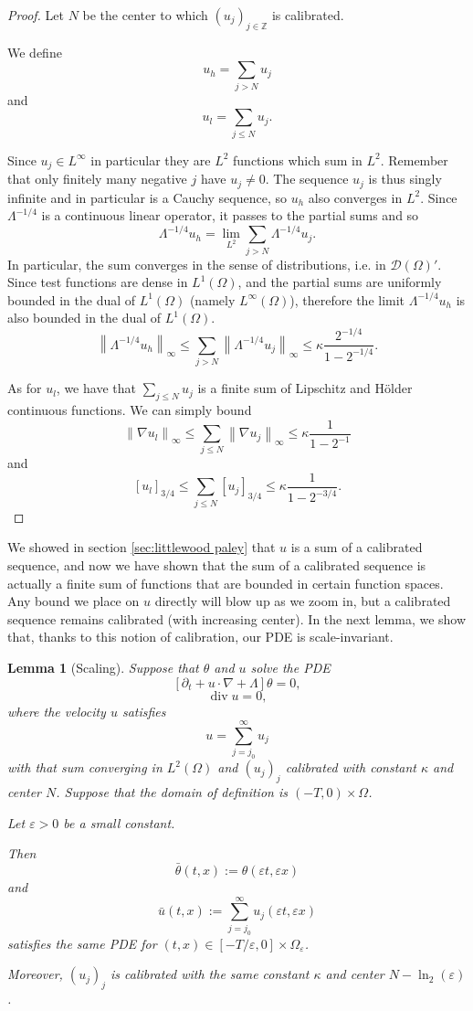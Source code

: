 \documentclass[11pt]{amsart}
\newtheorem{lemma}[theorem]{Lemma}
\theoremstyle{remark}
\theoremstyle{definition}
\newcommand{\Z}{\mathbb{Z}}
\newcommand{\eps}{\varepsilon}
\newcommand{\norm}[1]{\left\lVert#1\right\rVert}
\newcommand{\bracket}[1]{\left[ #1 \right]}
\newcommand{\del}{\partial}
\newcommand{\grad}{\nabla}
\renewcommand{\div}{\operatorname{div}}
\newcommand{\test}{\mathcal{D}}
\newcommand{\ulow}{u_l}
\newcommand{\uhigh}{u_h}
\begin{document}
\begin{proof}
Let $N$ be the center to which $(u_j)_{j \in \Z}$ is calibrated.  

We define
\[ \uhigh = \sum_{j > N} u_j \]
and 
\[ \ulow = \sum_{j \leq N} u_j. \]

Since $u_j \in L^\infty$ in particular they are $L^2$ functions which sum in $L^2$.  Remember that only finitely many negative $j$ have $u_j \neq 0$.  The sequence $u_j$ is thus singly infinite and in particular is a Cauchy sequence, so $\uhigh$ also converges in $L^2$.  Since $\Lambda^{-1/4}$ is a continuous linear operator, it passes to the partial sums and so
\[ \Lambda^{-1/4} \uhigh = \lim_{L^2} \sum_{j>N} \Lambda^{-1/4} u_j. \]
In particular, the sum converges in the sense of distributions, i.e. in $\test(\Omega)'$.  Since test functions are dense in $L^1(\Omega)$, and the partial sums are uniformly bounded in the dual of $L^1(\Omega)$ (namely $L^\infty(\Omega)$), therefore the limit $\Lambda^{-1/4} \uhigh$ is also bounded in the dual of $L^1(\Omega)$.  
\[ \norm{\Lambda^{-1/4} \uhigh}_\infty \leq \sum_{j>N} \norm{\Lambda^{-1/4} u_j}_\infty \leq \kappa \frac{2^{-1/4}}{1-2^{-1/4}}. \]

As for $\ulow$, we have that $\sum_{j \leq N} u_j$ is a finite sum of Lipschitz and H\"{o}lder continuous functions.  We can simply bound
\[ \norm{\grad \ulow}_\infty \leq \sum_{j \leq N} \norm{\grad u_j}_\infty \leq \kappa \frac{1}{1 - 2^{-1}} \]
and
\[ \bracket{\ulow}_{3/4} \leq \sum_{j \leq N} \bracket{u_j}_{3/4} \leq \kappa \frac{1}{1 - 2^{-3/4}}. \]
\end{proof}

We showed in section \ref{sec:littlewood paley} that $u$ is a sum of a calibrated sequence, and now we have shown that the sum of a calibrated sequence is actually a finite sum of functions that are bounded in certain function spaces.  Any bound we place on $u$ directly will blow up as we zoom in, but a calibrated sequence remains calibrated (with increasing center).  In the next lemma, we show that, thanks to this notion of calibration, our PDE is scale-invariant.  

\begin{lemma}[Scaling] \label{thm:scaling}
Suppose that $\theta$ and $u$ solve the PDE
\[ \bracket{\del_t + u\cdot\grad + \Lambda} \theta = 0,\]
\[ \div u = 0, \]
where the velocity $u$ satisfies
\[ u = \sum_{j=j_0}^\infty u_j \]
with that sum converging in $L^2(\Omega)$ and $(u_j)_j$ calibrated with constant $\kappa$ and center $N$.  Suppose that the domain of definition is $(-T,0) \times \Omega$.  

Let $\eps>0$ be a small constant. 

Then
\[ \bar{\theta}(t,x) := \theta(\eps t, \eps x) \]
and
\[ \bar{u}(t,x) := \sum_{j=j_0}^\infty u_j(\eps t, \eps x) \]
satisfies the same PDE for $(t,x) \in [-T/\eps, 0]\times \Omega_\eps$.  

Moreover, $(u_j)_j$ is calibrated with the same constant $\kappa$ and center $N - \ln_2(\eps)$.  

\end{lemma}
\end{document}

